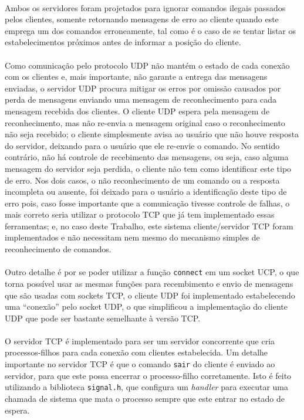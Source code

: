 \documentclass[a4paper,10pt,oneside,final,titlepage,onecolumn]{scrartcl}
\begin{document}
\paragraph{}Ambos os servidores foram projetados para ignorar comandos ilegais passados pelos clientes, somente retornando mensagens de erro ao cliente quando este emprega um dos comandos erroneamente, tal como é o caso de se tentar listar os estabelecimentos próximos antes de informar a posição do cliente.
\paragraph{}Como comunicação pelo protocolo UDP não mantém o estado de cada conexão com os clientes e, mais importante, não garante a entrega das mensagens enviadas, o servidor UDP procura mitigar os erros por omissão causados por perda de mensagens enviando uma mensagem de reconhecimento para cada mensagem recebida dos clientes. O cliente UDP espera pela mensagem de reconhecimento, mas não re-envia a mensagem original caso o reconhecimento não seja recebido; o cliente simplesmente avisa ao usuário que não houve resposta do servidor, deixando para o usuário que ele re-envie o comando. No sentido contrário, não há controle de recebimento das mensagens, ou seja, caso alguma mensagem do servidor seja perdida, o cliente não tem como identificar este tipo de erro. Nos dois casos, o não reconhecimento de um comando ou a resposta incompleta ou ausente, foi deixado para o usuário a identificação deste tipo de erro pois, caso fosse importante que a comunicação tivesse controle de falhas, o mais correto seria utilizar o protocolo TCP que já tem implementado essas ferramentas; e, no caso deste Trabalho, este sistema cliente/servidor TCP foram implementados e não necessitam nem mesmo do mecanismo simples de reconhecimento de comandos.
\paragraph{}Outro detalhe é por se poder utilizar a função \verb|connect| em um socket UCP, o que torna possível usar as mesmas funções para recembimento e envio de mensagens que são usadas com sockets TCP, o cliente UDP foi implementado estabelecendo uma ``conexão'' pelo socket UDP, o que simplificou a implementação do cliente UDP que pode ser bastante semelhante à versão TCP. 
\paragraph{}O servidor TCP é implementado para ser um servidor concorrente que cria processos-filhos para cada conexão com clientes estabelecida. Um detalhe importante no servidor TCP é que o comando \verb|sair| do cliente é enviado ao servidor, para que este possa encerrar o processo-filho corretamente. Isto é feito utilizando a biblioteca \verb|signal.h|, que configura um \emph{handler} para executar uma chamada de sistema que mata o processo sempre que este entrar no estado de espera.
\end{document}
